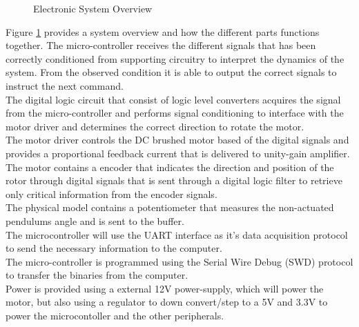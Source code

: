 \begin{figure}[h]
	\centering
	
	\caption{Electronic System Overview}
	\label{fig:electronicSystemOverview}
\end{figure}



Figure \ref{fig:electronicSystemOverview} provides a system overview and how the different parts functions together. The micro-controller receives the different signals that has been correctly conditioned from supporting circuitry to interpret the dynamics of the system. From the observed condition it is able to output the correct signals to instruct the next command.\\

The digital logic circuit that consist of logic level converters acquires the signal from the micro-controller and performs signal conditioning to interface with the motor driver and determines the correct direction to rotate the motor. \\

The motor driver controls the DC brushed motor based of the digital signals and provides a proportional feedback current that is delivered to unity-gain amplifier.\\

The motor contains a encoder that indicates the direction and position of the rotor through digital signals that is sent through a digital logic filter to retrieve only critical information from the encoder signals. \\

The physical model contains a potentiometer that measures the non-actuated pendulums angle and is sent to the buffer.\\

The microcontroller will use the UART interface as it's data acquisition protocol to send the necessary information to the computer. \\

The micro-controller is programmed using the Serial Wire Debug (SWD) protocol to transfer the binaries from the computer.\\

Power is provided using a external 12V power-supply, which will power the motor, but also using a regulator to down convert/step to a 5V and 3.3V to power the microcontoller and the other peripherals.


